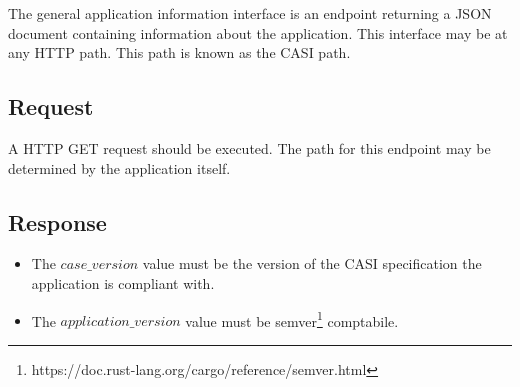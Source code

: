 The general application information interface is an endpoint
returning a JSON document containing information about the application.
This interface may be at any HTTP path.
This path is known as the CASI path.

\subsection{Request}
\label{subsec:request-general-application-information}

A HTTP GET request should be executed.
The path for this endpoint may be determined by the application itself.

\subsection{Response}
\label{subsec:response-general-application-information}

\begin{itemize}
    \item The $case\_version$ value must be the version of the CASI specification the application is compliant with.
    \item The $application\_version$ value must be semver\footnote{https://doc.rust-lang.org/cargo/reference/semver.html} comptabile.
\end{itemize}


